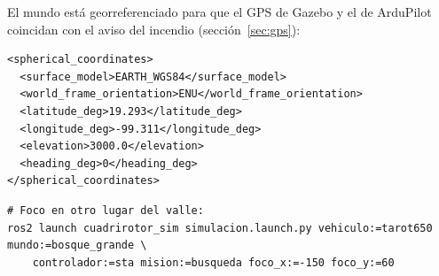 El mundo está georreferenciado para que el GPS de Gazebo y el de ArduPilot coincidan con el aviso
del incendio (sección~\ref{sec:gps}):
\begin{lstlisting}[style=xml]
<spherical_coordinates>
  <surface_model>EARTH_WGS84</surface_model>
  <world_frame_orientation>ENU</world_frame_orientation>
  <latitude_deg>19.293</latitude_deg>
  <longitude_deg>-99.311</longitude_deg>
  <elevation>3000.0</elevation>
  <heading_deg>0</heading_deg>
</spherical_coordinates>
\end{lstlisting}

\begin{lstlisting}[style=bash]
# Foco en otro lugar del valle:
ros2 launch cuadrirotor_sim simulacion.launch.py vehiculo:=tarot650 mundo:=bosque_grande \
    controlador:=sta mision:=busqueda foco_x:=-150 foco_y:=60
\end{lstlisting}
